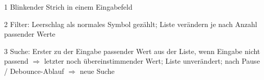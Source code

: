 \begin{table}[!htb]
\begin{adjustbox}{max width=\textwidth}
\begin{threeparttable}
\begin{tabular}{ l || l | l | l }
                \hline
            \end{tabular}
            \begin{tablenotes}
                \scriptsize
                \item[1] Blinkender Strich in einem Eingabefeld
                \item[2] Filter: Leerschlag als normales Symbol gezählt; 
                                Liste verändern je nach Anzahl passender Werte
                \item[3] Suche: Erster zu der Eingabe passender Wert aus der Liste, wenn Eingabe nicht passend $\Rightarrow$ letzter noch übereinstimmender Wert; 
                                Liste unverändert; nach Pause / Debounce-Ablauf $\Rightarrow$ neue Suche
            \end{tablenotes}
        \end{threeparttable}
    \end{adjustbox}
\end{table}
